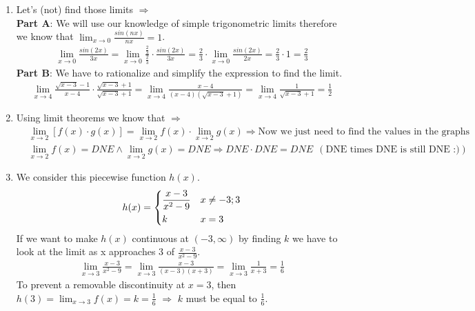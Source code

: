 \documentclass[13pt, a4paper, twoside]{article}
\begin{document}
\begin{enumerate}
    \item Let's (not) find those limits $\Rightarrow$\\
    \textbf{Part A}: We will use our knowledge of simple trigonometric limits
    therefore we know that $\lim_{x\to 0}\frac{sin(nx)}{nx}=1$.
    \begin{align*}
        \lim_{x\to 0} \frac{sin(2x)}{3x} =
         \lim_{x\to 0}\frac{\frac{2}{3}}{\frac{2}{3}} \cdot
         \frac{sin(2x)}{3x} = \frac{2}{3}\cdot \lim_{x\to0}\frac{sin(2x)}{2x}
         =\frac{2}{3} \cdot 1 = \frac{2}{3}
    \end{align*}
    \textbf{Part B}: We have to rationalize and simplify the expression
    to find the limit.
    \begin{align*}
        \lim_{x\to 4}\frac{\sqrt{x-3}-1}{x-4}\cdot
        \frac{\sqrt{x-3}+1}{\sqrt{x-3}+1} =
        \lim_{x\to 4} \frac{x-4}{(x-4)(\sqrt{x-3}+1)} = 
        \lim_{x\to4} \frac{1}{\sqrt{x-3}+1} = \frac{1}{2}
    \end{align*}
    \item Using limit theorems we know that $\Rightarrow$
    \begin{align*}
        &\lim_{x\to 2}[f(x)\cdot g(x)] = \lim_{x\to 2}f(x) \cdot
        \lim_{x\to 2}g(x) \Rightarrow \text{Now we just need to find the values in the graphs}\\
        &\lim_{x\to 2} f(x) = DNE \wedge  \lim_{x\to 2}g(x) = DNE \Rightarrow DNE\cdot DNE = DNE \: \:
        (\text{DNE times DNE is still DNE :)})
    \end{align*}
    \item We consider this piecewise function $h(x)$.
    \[
    h(x)=
    \begin{dcases}
        \frac{x-3}{x^2-9}& x\neq -3; 3\\
        k & x=3
    \end{dcases}    
    \]
    If we want to make $h(x)$ continuous at $(-3, \infty)$ by finding $k$ we have to look
    at the limit as x approaches 3 of $\frac{x-3}{x^2-9}$.
    \begin{align*}
        \lim_{x\to 3}\frac{x-3}{x^2-9} = \lim_{x\to 3} 
        \frac{x-3}{(x-3)(x+3)} = \lim_{x\to3} \frac{1}{x+3}= \frac{1}{6}  
    \end{align*}
    To prevent a removable discontinuity at $x=3$, then
    $h(3) = \lim_{x\to3}f(x) = k = \frac{1}{6}$ $\Rightarrow$
    $k$ must be equal to $\frac{1}{6}$.
\end{enumerate}
\end{document}

